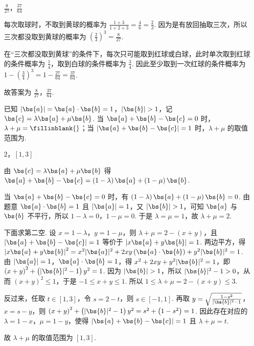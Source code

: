 \begin{answer}
\(\frac{8}{27}\)，\(\frac{37}{64}\)
\end{answer}

\begin{solution}
每次取球时，不取到黄球的概率为 \(\frac{1+3}{1+2+3}=\frac{4}{6}=\frac{2}{3}\). 因为是有放回抽取三次，所以三次都没取到黄球的概率为 \(\left( \frac{2}{3} \right)^3=\frac{8}{27}\).

在“三次都没取到黄球”的条件下，每次只可能取到红球或白球，此时单次取到红球的条件概率为 \(\frac{1}{4}\)，取到白球的条件概率为 \(\frac{3}{4}\). 因此至少取到一次红球的条件概率为 \(1-\left( \frac{3}{4} \right)^3=1-\frac{27}{64}=\frac{37}{64}\).

故答案为 \(\frac{8}{27}\)，\(\frac{37}{64}\).
\end{solution}

\begin{problem}
已知 \(|\bs{a}|=\bs{a}\cdot \bs{b}=1\)，\(|\bs{b}|>1\)，记 \(\bs{c}=\lambda \bs{a}+\mu \bs{b}\). 当 \(\bs{a}+\bs{b}-\bs{c}=0\) 时，\(\lambda+\mu=\fillinblank{}\)；当 \(|\bs{a}+\bs{b}-\bs{c}|=1\) 时，\(\lambda+\mu\) 的取值范围为\fillinblank{}.
\end{problem}

\begin{answer}
\(2\)，\([1,3]\)
\end{answer}

\begin{solution}
由 \(\bs{c}=\lambda \bs{a}+\mu \bs{b}\) 得 \(\bs{a}+\bs{b}-\bs{c}=\left( 1-\lambda \right)\bs{a}+\left( 1-\mu \right)\bs{b}\).

当 \(\bs{a}+\bs{b}-\bs{c}=0\) 时，有 \(\left( 1-\lambda \right)\bs{a}+\left( 1-\mu \right)\bs{b}=0\). 由题意 \(\bs{a}\cdot \bs{b}=1\) 且 \(|\bs{a}|=1\)，又 \(|\bs{b}|>1\)，可知 \(\bs{a}\) 与 \(\bs{b}\) 不平行，所以 \(1-\lambda=0\)，\(1-\mu=0\). 于是 \(\lambda=\mu=1\)，故 \(\lambda+\mu=2\).

下面求第二空. 设 \(x=1-\lambda\)，\(y=1-\mu\)，则 \(\lambda+\mu=2-\left( x+y \right)\)，且 \(\left| \bs{a}+\bs{b}-\bs{c} \right|=1\) 等价于 \(\left| x\bs{a}+y\bs{b} \right|=1\). 两边平方，得 \(\left| x\bs{a}+y\bs{b} \right|^2=x^2|\bs{a}|^2+2xy\left( \bs{a}\cdot \bs{b} \right)+y^2|\bs{b}|^2=1\). 由 \(|\bs{a}|=1\)，\(\bs{a}\cdot \bs{b}=1\)，得 \(x^2+2xy+y^2|\bs{b}|^2=1\)，即 \(\left( x+y \right)^2+\left( |\bs{b}|^2-1 \right)y^2=1\). 因为 \(|\bs{b}|>1\)，所以 \(|\bs{b}|^2-1>0\)，从而 \(\left( x+y \right)^2\le 1\)，于是 \(-1\le x+y\le 1\). 所以 \(1\le \lambda+\mu=2-\left( x+y \right)\le 3\).

反过来，任取 \(t\in [1,3]\)，令 \(s=2-t\)，则 \(s\in [-1,1]\). 再取 \(y=\sqrt{\frac{1-s^2}{|\bs{b}|^2-1}}\)，\(x=s-y\)，则 \(\left( x+y \right)^2+\left( |\bs{b}|^2-1 \right)y^2=s^2+\left( 1-s^2 \right)=1\). 因此存在对应的 \(\lambda=1-x\)，\(\mu=1-y\)，使得 \(|\bs{a}+\bs{b}-\bs{c}|=1\) 且 \(\lambda+\mu=t\).

故 \(\lambda+\mu\) 的取值范围为 \([1,3]\).
\end{solution}

